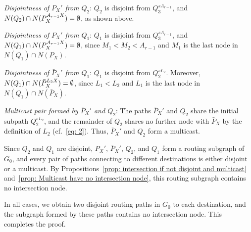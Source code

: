\documentclass[11pt]{article}
\begin{document}
\par\vspace{0.4em}
\noindent\emph{Disjointness of \(P_X'\) from \(Q_2\)}:
\(Q_2\) is disjoint from \(Q_3^{sA_{r-1}}\), and \(N(Q_2)\cap N(P_X^{A_{r-1}X})=\nobreak\emptyset\), as shown above.

\par\vspace{0.4em}
\noindent\emph{Disjointness of \(P_X'\) from \(Q_1\)}:
\(Q_1\) is disjoint from \(Q_3^{sA_{r-1}}\), and \(N(Q_1)\cap N(P_X^{A_{r-1}X})=\nobreak\emptyset\), since \(M_1<M_2<A_{r-1}\) and \(M_1\) is the last node in \(N(Q_1)\cap N(P_X)\).

\par\vspace{0.4em}
\noindent\emph{Disjointness of \(\bar P_X'\) from \(Q_1\)}:
\(Q_1\) is disjoint from \(Q_2^{sL_2}\). Moreover, \(N(Q_1)\cap N(\bar P_X^{L_2X})=\nobreak\emptyset\), since \(L_1<L_2\) and \(L_1\) is the last node in \(N(Q_1)\cap N(\bar P_X)\).

\par\vspace{0.4em}
\noindent\emph{Multicast pair formed by \(\bar P_X'\) and \(Q_2\)}:
The paths \(\bar P_X'\) and \(Q_2\) share the initial subpath \(Q_2^{sL_2}\), and the remainder of \(Q_2\) shares no further node with \(\bar P_X\) by the definition of \(L_2\) (cf.~\eqref{eq: 2}). Thus, \(\bar P_X'\) and \(Q_2\) form a multicast.

\par\vspace{0.6em}
\noindent Since \(Q_2\) and \(Q_1\) are disjoint, \(P_X'\), \(\bar P_X'\), \(Q_2\), and \(Q_1\) form a routing subgraph of \(G_0\), and every pair of paths connecting to different destinations is either disjoint or a multicast. By Propositions~\ref{prop: intersection if not disjoint and multicast} and~\ref{prop: Multicast have no intersection node}, this routing subgraph contains no intersection node.

\par\vspace{0.6em}
In all cases, we obtain two disjoint routing paths in \(G_0\) to each destination, and the subgraph formed by these paths contains no intersection node. This completes the proof.
\end{document}
